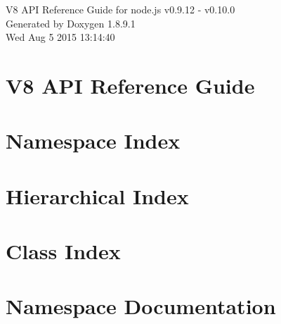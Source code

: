 \documentclass[twoside]{book}
\newcommand{\+}{\discretionary{\mbox{\scriptsize$\hookleftarrow$}}{}{}}
\newcommand{\clearemptydoublepage}{%
  \newpage{\pagestyle{empty}\cleardoublepage}%
}
\begin{document}
\hypersetup{pageanchor=false,
             bookmarks=true,
             bookmarksnumbered=true,
             pdfencoding=unicode
            }
\begin{titlepage}
\vspace*{7cm}
\begin{center}%
{\Large V8 A\+P\+I Reference Guide for node.\+js v0.9.12 -\/ v0.10.0 }\\
\vspace*{1cm}
{\large Generated by Doxygen 1.8.9.1}\\
\vspace*{0.5cm}
{\small Wed Aug 5 2015 13:14:40}\\
\end{center}
\end{titlepage}
\clearemptydoublepage
\tableofcontents
\clearemptydoublepage
{}
\hypersetup{pageanchor=true}

\chapter{V8 A\+P\+I Reference Guide}
\label{index}\hypertarget{index}{}
\chapter{Namespace Index}

\chapter{Hierarchical Index}

\chapter{Class Index}

\chapter{Namespace Documentation}

\end{document}
